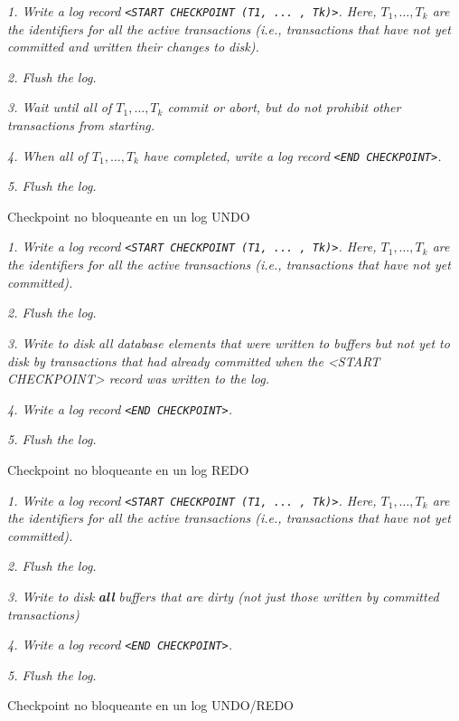 \documentclass[a4paper, twoside]{article}
\begin{document}
\begin{algorithm}[H]
\emph{1. Write a log record }\texttt{\emph{<START CHECKPOINT (T1,
... , Tk)>}}\emph{. Here, $T_{1},\ldots,T_{k}$ are the identifiers
for all the active transactions (i.e., transactions that have not
yet committed and written their changes to disk). }

\emph{2. Flush the log.}

\emph{3. Wait until all of $T_{1},\ldots,T_{k}$ commit or abort,
but do not prohibit other transactions from starting. }

\emph{4. When all of $T_{1},\ldots,T_{k}$ have completed, write a
log record }\texttt{\emph{<END CHECKPOINT>}}\emph{. }

\emph{5. Flush the log.}

\protect\caption{Checkpoint no bloqueante en un log UNDO}
\end{algorithm}


\begin{algorithm}[H]
\emph{1. Write a log record }\texttt{\emph{<START CHECKPOINT (T1,
... , Tk)>}}\emph{. Here, $T_{1},\ldots,T_{k}$ are the identifiers
for all the active transactions (i.e., transactions that have not
yet committed). }

\emph{2. Flush the log.}

\emph{3. Write to disk all database elements that were written to
buffers but not yet to disk by transactions that had already committed
when the <START CHECKPOINT> record was written to the log.}

\emph{4. Write a log record }\texttt{\emph{<END CHECKPOINT>}}\emph{. }

\emph{5. Flush the log.}

\protect\caption{Checkpoint no bloqueante en un log REDO}
\end{algorithm}


\begin{algorithm}[H]
\emph{1. Write a log record }\texttt{\emph{<START CHECKPOINT (T1,
... , Tk)>}}\emph{. Here, $T_{1},\ldots,T_{k}$ are the identifiers
for all the active transactions (i.e., transactions that have not
yet committed). }

\emph{2. Flush the log.}

\emph{3. Write to disk }\textbf{\emph{all}}\emph{ buffers that are
dirty (not just those written by committed transactions)}

\emph{4. Write a log record }\texttt{\emph{<END CHECKPOINT>}}\emph{. }

\emph{5. Flush the log.}

\protect\caption{Checkpoint no bloqueante en un log UNDO/REDO}
\end{algorithm}
\end{document}
